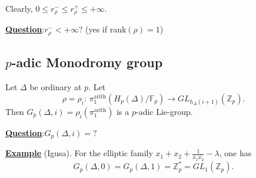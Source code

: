 \documentclass[a4paper,oneside,11pt]{article}
\theoremstyle{plain} \theoremstyle{definition}
\theoremstyle{remark}
\newcommand{\Z}{\mathbb{Z}}
\newcommand{\f}{\mathbb{F}}
\begin{document}
Clearly, $0\leq r_\rho^- \leq r_\rho^+ \leq +\infty$.

\medskip
\underline{\bf Question}:\quad $r_\rho^-< +\infty$? (yes if rank$(\rho)=1$)



\subsection{$p$-adic Monodromy group}

Let $\Delta$ be ordinary at $p$. Let
$$\rho=\rho_i:\, \pi_1^{\text{arith}}(H_p(\Delta)/\f_p)\longrightarrow
GL_{h_{\Delta}(i+1)}(\Z_p).$$
Then $G_p(\Delta, i)=\rho_i(\pi_1^{\text{arith}})$ is a $p$-adic
Lie-group.

\bigskip
\underline{\bf Question}:\quad $G_p(\Delta, i)=?$

\bigskip
\underline{\bf Example} (Igusa). For the elliptic family $x_1+x_2+\frac{1}{x_1x_2}-\lambda$,
one has
$$G_p(\Delta, 0)=G_p(\Delta, 1) =\Z_p^* =GL_1(\Z_p).$$
\end{document}
